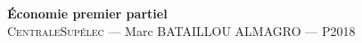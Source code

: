 \documentclass[12pt,oneside,a4paper]{article}
\begin{document}
\begin{center}
{\LARGE \bfseries 
 Économie premier partiel \\[0.3cm] 
}
{\large
  \textsc{CentraleSupélec} --- Marc BATAILLOU ALMAGRO --- P2018\\[0.7cm]
}
\end{center}
  
{\hypersetup{linkcolor=black}
\tableofcontents
}


\end{document}
